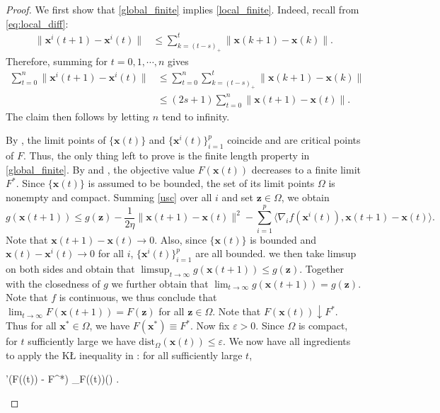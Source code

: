 \documentclass[leqno,onefignum,onetabnum]{siamart0516}
\newcommand{\xb}{\mathbf{x}}
\newcommand{\zb}{\mathbf{z}}
\newcommand{\dist}{\mathrm{dist}}
\newcommand{\zero}{\mathbf{0}}
\newcommand{\KL}{K\L\xspace}
\newcommand{\inner}[2]{\langle #1, #2 \rangle}
\begin{document}
\begin{proof}
	We first show that \cref{global_finite} implies \cref{local_finite}. Indeed, recall from \eqref{eq:local_diff}:
	\begin{align*}
	\|\xb^i(t+1) - \xb^i(t)\| 
	&\leq 
	\sum_{k=(t-s)_+}^{t} \|\xb(k+1) - \xb(k)\|.
	\end{align*}
	Therefore, summing for $t=0, 1, \cdots, n$ gives
	\begin{align*}
	\sum_{t=0}^n \|\xb^i(t+1) - \xb^i(t)\| 
	&\leq 
	\sum_{t=0}^n  \sum_{k=(t-s)_+}^{t} \|\xb(k+1) - \xb(k)\|
	\\
	&\leq 
	(2s+1) \sum_{t=0}^n \|\xb(t+1) - \xb(t)\|.
	\end{align*}
	The claim then follows by letting $n$ tend to infinity. 
	
	By , the limit points of $\{\xb(t)\}$ and $\{\xb^i(t)\}_{i=1}^p$ coincide and are critical points of $F$. Thus, the only thing left to prove is the finite length property in \cref{global_finite}. 
	By  and , the objective value $F(\xb(t))$   decreases to a finite limit $F^*$. 
	Since $\{\xb(t)\}$ is assumed to be bounded, the set of its limit points $\Omega$ is nonempty and compact. Summing \cref{usc} over all $i$ and set $\zb \in \Omega$, we obtain
	\[
	g(\xb(t+1)) \le g(\zb) - \frac{1}{2\eta} \|\xb(t+1) - \xb(t)\|^2 - \sum_{i=1}^{p}\inner{\nabla_i f(\xb^i(t))}{\xb(t+1) - \xb(t)}.
	\]
	Note that $\xb(t+1) - \xb(t) \to 0$.  Also, since $\{\xb(t)\}$ is bounded and $\xb(t) - \xb^i(t)\to 0$ for all $i$, $\{\xb^i(t)\}_{i=1}^p$ are all bounded.  we then take limsup on both sides and obtain that $\limsup_{t\to\infty} g(\xb(t+1)) \le g(\zb)$. Together with the closedness of $g$ we further obtain that $\lim_{t\to\infty} g(\xb(t+1)) = g(\zb)$. Note that $f$ is continuous, we thus conclude that $\lim_{t\to\infty} F(\xb(t+1)) = F(\zb)$ for all $\zb\in \Omega$. Note that $F(\xb(t)) \downarrow F^*$. Thus for all $\xb^* \in \Omega$, we have $F(\xb^*) \equiv F^*$. 
	Now fix $\varepsilon > 0$. Since $\Omega$ is compact, for $t$ sufficiently large we have $\dist_{\Omega}(\xb(t)) \leq \varepsilon$. We now have all ingredients to apply the  \KL inequality in : for all sufficiently large $t$,
	\begin{flalign}\label{uKL}
	\varphi'\big(F(\xb(t)) - F^*\big) \cdot \dist_{\partial F(\xb(t))}(\zero) .
	\end{flalign}

\end{proof}
\end{document}
